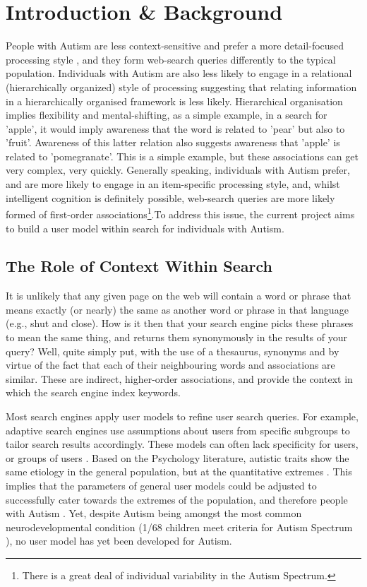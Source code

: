 \documentclass[a4paper, 10pt]{article}
\begin{document}
\section{Introduction \& Background}\label{prob}
People with Autism are less context-sensitive and prefer a more detail-focused processing style \cite{mottron}, and they form web-search queries differently to the typical population. Individuals with Autism are also less likely to engage in a relational (hierarchically organized) style of processing \cite{bowler} suggesting that relating information in a hierarchically organised framework is less likely. Hierarchical organisation implies flexibility and mental-shifting, as a simple example, in a search for 'apple', it would imply awareness that the word is related to 'pear' but also to 'fruit'. Awareness of this latter relation also suggests awareness that 'apple' is related to 'pomegranate'. This is a simple example, but these associations can get very complex, very quickly. Generally speaking, individuals with Autism prefer, and are more likely to engage in an item-specific processing style, and, whilst intelligent cognition is definitely possible, web-search queries are more likely formed of first-order associations\footnote{There is a great deal of individual variability in the Autism Spectrum.}.To address this issue, the current project aims to build a user model within search for individuals with Autism. 

\subsection{The Role of Context Within Search} \label{the problem}
It is unlikely that any given page on the web will contain a word or phrase that means exactly (or nearly) the same as another word or phrase in that language (e.g., shut and close). How is it then that your search engine picks these phrases to mean the same thing, and returns them synonymously in the results of your query? Well, quite simply put, with the use of a thesaurus, synonyms and by virtue of the fact that each of their neighbouring words and associations are similar. These are indirect, higher-order associations, and provide the context in which the search engine index keywords.

Most search engines apply user models to refine user search queries. For example, adaptive search engines use assumptions about users from specific subgroups to tailor search results accordingly. These models can often lack specificity for users, or groups of users \cite{usermodel}.  Based on the Psychology literature, autistic traits show the same etiology in the general population, but at the quantitative extremes \cite{robinson}. This implies that the parameters of general user models could be adjusted to successfully cater towards the extremes of the population, and therefore people with Autism \cite{bonel}. Yet, despite Autism being amongst the most common neurodevelopmental condition (1/68 children meet criteria for Autism Spectrum \cite{CDC}), no user model has yet been developed for Autism. 
\end{document}
